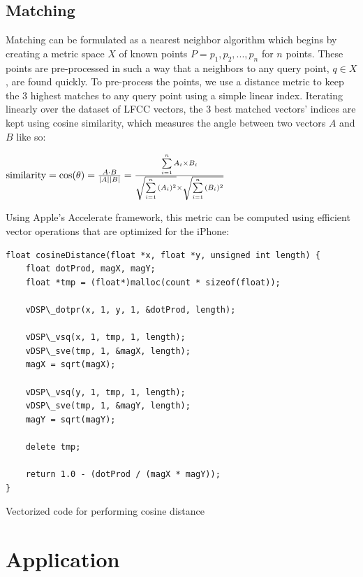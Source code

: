 \documentclass[a4paper,10pt,final]{ThesisStyle}
\begin{document}

\subsection{Matching}

Matching can be formulated as a nearest neighbor algorithm which begins by creating a metric space $X$ of known points $P = p_1, p_2, ..., p_n$ for $n$ points.  These points are pre-processed in such a way that a neighbors to any query point, $q \in X$, are found quickly.  To pre-process the points, we use a distance metric to keep the 3 highest matches to any query point using a simple linear index.  Iterating linearly over the dataset of LFCC vectors, the 3 best matched vectors' indices are kept using cosine similarity, which measures the angle between two vectors $A$ and $B$ like so:

\begin{math}
\textnormal{similarity} = \cos(\theta) = {A \cdot B \over |A| |B|} = \frac{ \sum\limits_{i=1}^{n}{A_i \times B_i} }{ \\ \sqrt{\sum\limits_{i=1}^{n}{(A_i)^2}} \times \sqrt{\sum\limits_{i=1}^{n}{(B_i)^2}}} 
\end{math}

Using Apple's Accelerate framework, this metric can be computed using efficient vector operations that are optimized for the iPhone:
\clearpage
\begin{program}
\begin{verbatim}
float cosineDistance(float *x, float *y, unsigned int length) {
	float dotProd, magX, magY;
	float *tmp = (float*)malloc(count * sizeof(float));
	
	vDSP\_dotpr(x, 1, y, 1, &dotProd, length);
	
	vDSP\_vsq(x, 1, tmp, 1, length);
	vDSP\_sve(tmp, 1, &magX, length);
	magX = sqrt(magX);
	
	vDSP\_vsq(y, 1, tmp, 1, length);
	vDSP\_sve(tmp, 1, &magY, length);
	magY = sqrt(magY);
	
	delete tmp;
	
	return 1.0 - (dotProd / (magX * magY));
}
\end{verbatim}
\caption{Vectorized code for performing cosine distance}
\end{program}

\section{Application}
\end{document}
